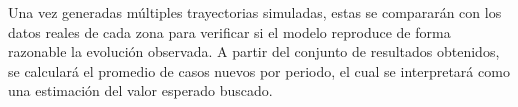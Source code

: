 \documentclass[12pt]{article}
\begin{document}
Una vez generadas múltiples trayectorias simuladas, estas se compararán con los
datos reales de cada zona para verificar si el modelo reproduce de forma
razonable la evolución observada. A partir del conjunto de resultados
obtenidos, se calculará el promedio de casos nuevos por periodo, el cual se
interpretará como una estimación del valor esperado buscado.

\newpage

\printbibliography
\end{document}
